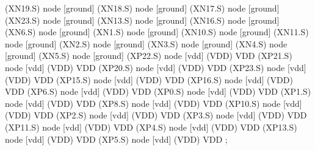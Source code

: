 \begin{circuitikz}[american]


	(XN19.S) node [ground] {}
	(XN18.S) node [ground] {}
	(XN17.S) node [ground] {}
	(XN23.S) node [ground] {}
	(XN13.S) node [ground] {}
	(XN16.S) node [ground] {}
	(XN6.S) node [ground] {}
	(XN1.S) node [ground] {}
	(XN10.S) node [ground] {}
	(XN11.S) node [ground] {}
	(XN2.S) node [ground] {}
	(XN3.S) node [ground] {}
	(XN4.S) node [ground] {}
	(XN5.S) node [ground] {}
	(XP22.S) node [vdd] (VDD) {VDD}
	(XP21.S) node [vdd] (VDD) {VDD}
	(XP20.S) node [vdd] (VDD) {VDD}
	(XP23.S) node [vdd] (VDD) {VDD}
	(XP15.S) node [vdd] (VDD) {VDD}
	(XP16.S) node [vdd] (VDD) {VDD}
	(XP6.S) node [vdd] (VDD) {VDD}
	(XP0.S) node [vdd] (VDD) {VDD}
	(XP1.S) node [vdd] (VDD) {VDD}
	(XP8.S) node [vdd] (VDD) {VDD}
	(XP10.S) node [vdd] (VDD) {VDD}
	(XP2.S) node [vdd] (VDD) {VDD}
	(XP3.S) node [vdd] (VDD) {VDD}
	(XP11.S) node [vdd] (VDD) {VDD}
	(XP4.S) node [vdd] (VDD) {VDD}
	(XP13.S) node [vdd] (VDD) {VDD}
	(XP5.S) node [vdd] (VDD) {VDD}
;

\end{circuitikz}
